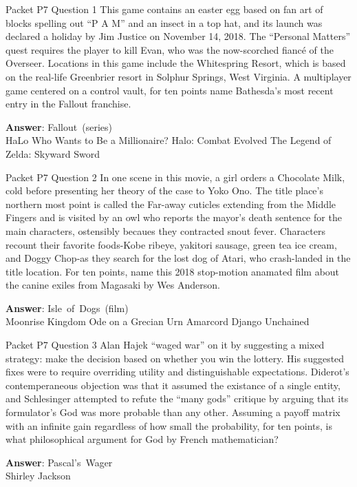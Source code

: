 \begin{frame}{Packet P7 Question 1}
This game contains an easter egg based on fan art of blocks spelling out ``P A M'' and an insect in a top hat, and its launch was declared a holiday by Jim Justice on November 14, 2018.  The ``Personal Matters'' quest requires the player to kill Evan, who was the now-scorched fiancé of the Overseer.  Locations in this game include the Whitespring Resort, which is based on the real-life Greenbrier resort in Solphur Springs, West Virginia.  A multiplayer game centered on a control vault, for ten points name Bathesda's most recent entry in the Fallout franchise.         

\textbf{Answer}: Fallout\ (series)\\
 HaLo
 Who Wants to Be a Millionaire?
 Halo: Combat Evolved
 The Legend of Zelda: Skyward Sword
\end{frame}

\begin{frame}{Packet P7 Question 2}
In one scene in this movie, a girl orders a Chocolate Milk, cold before presenting her theory of the case to Yoko Ono.  The title place's northern most point is called the Far-away cuticles extending from the Middle Fingers and is visited by an owl who reports the  mayor's death sentence for the main characters, ostensibly becaues they contracted snout fever.  Characters recount their favorite foods-Kobe ribeye, yakitori sausage, green tea ice cream, and Doggy Chop-as they search for the lost dog of Atari, who crash-landed in the title location.  For ten points, name this 2018 stop-motion anamated film about the canine exiles from Magasaki by Wes Anderson.           

\textbf{Answer}: Isle\ of\ Dogs\ (film)\\
 Moonrise Kingdom
 Ode on a Grecian Urn
 Amarcord
 Django Unchained
\end{frame}

\begin{frame}{Packet P7 Question 3}
Alan Hajek ``waged war'' on it by suggesting a mixed strategy: make the decision based on whether you win the lottery.  His   suggested fixes were to require overriding utility and distinguishable expectations.  Diderot's contemperaneous objection was that it assumed the existance of a single entity, and Schlesinger attempted to refute the ``many gods'' critique by arguing that its formulator's   God was more probable than any other.  Assuming a payoff matrix with an infinite gain regardless of how small the probability, for   ten points, is what philosophical argument for God by French   mathematician?

\textbf{Answer}: Pascal's\ Wager\\
 Shirley Jackson
\end{frame}

